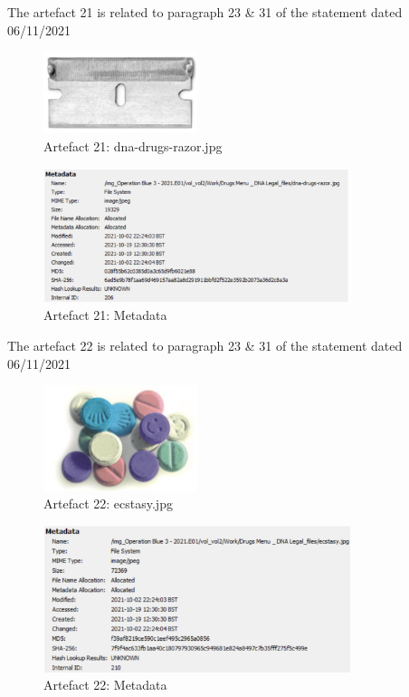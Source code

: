The artefact 21 is related to paragraph 23 \& 31 of the statement
dated 06/11/2021
\begin{figure}[H]
  \centering
  \includegraphics[width=0.4\textwidth]{figures/artefact21}
  \caption{Artefact 21: dna-drugs-razor.jpg}
  \label{f:artefact21}
\end{figure}
\begin{figure}[H]
  \centering
  \includegraphics[width=0.8\textwidth]{figures/meta21}
  \caption{Artefact 21: Metadata}
  \label{f:meta21}
\end{figure}
The artefact 22 is related to paragraph 23 \& 31 of the statement dated
06/11/2021
\begin{figure}[H]
  \centering
  \includegraphics[width=0.4\textwidth]{figures/artefact22}
  \caption{Artefact 22: ecstasy.jpg}
  \label{f:artefact22}
\end{figure}
\begin{figure}[H]
  \centering
  \includegraphics[width=0.8\textwidth]{figures/meta22}
  \caption{Artefact 22: Metadata}
  \label{f:meta22}
\end{figure}
